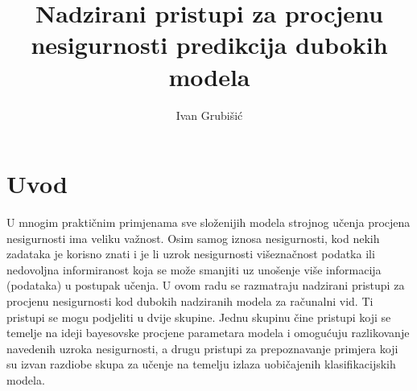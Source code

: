 \documentclass[utf8, diplomski, lmodern]{fer}
\begin{document}
\title{Nadzirani pristupi za procjenu nesigurnosti predikcija dubokih modela}
\author{Ivan Grubišić}
\maketitle





\tableofcontents

\newpage

\begingroup
\onehalfspacing
\printunsrtglossary[type=symbols,style=supergroup,title={Oznake}]
\endgroup



\chapter{Uvod}

U mnogim praktičnim primjenama sve složenijih modela strojnog učenja procjena nesigurnosti ima veliku važnost. Osim samog iznosa nesigurnosti, kod nekih zadataka je korisno znati i je li uzrok nesigurnosti višeznačnost podatka ili nedovoljna informiranost koja se može smanjiti uz unošenje više informacija (podataka) u postupak učenja. U ovom radu se razmatraju nadzirani pristupi za procjenu nesigurnosti kod dubokih nadziranih modela za računalni vid. Ti pristupi se mogu podjeliti u dvije skupine. Jednu skupinu čine pristupi koji se temelje na ideji bayesovske procjene parametara modela i omogućuju razlikovanje navedenih uzroka nesigurnosti, a drugu pristupi za prepoznavanje primjera koji su izvan razdiobe skupa za učenje na temelju izlaza uobičajenih klasifikacijskih modela.
\end{document}
